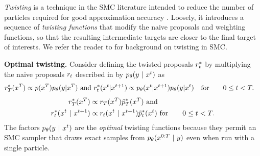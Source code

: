 
\emph{Twisting} is a technique in the SMC literature intended to reduce the number of particles required for good approximation accuracy \citep{guarniero2017iterated,heng2020controlled}. %
Loosely, it introduces a sequence of \emph{twisting functions} that modify the naive proposals and weighting functions, so that the resulting intermediate targets are closer to the final target of interests. 
We refer the reader to \citet[Chapter 3.2]{naesseth2019elements} for background on twisting in SMC.

\textbf{Optimal twisting.}
Consider defining the twisted proposals $r_t^*$ by multiplying the naive proposals $r_t$ described in  by $p_{\theta} (y ~\vert~ x^{t})$ as
\ifnum{}
\begin{align}\label{eq:optimal-twisted-proposals}
\proposal_T^* (\xT) &\propto p(\xT) \pmodel(y {|} \xT) \ \mathrm{and} \ 
     \proposal_t^* (\xt {|} \xtpo) \propto \pmodel(\xt {|} \xtpo) \pmodel(y{|} \xt) \quad \mathrm{for}  \qquad 0\leq t < T.
\end{align}
\else
\begin{align}\label{eq:optimal-twisted-proposals}
\proposal_T^* (\xT) &\propto \proposal_T (\xT) \twistfcn_T^* (\xT) \ \mathrm{and} \ 
\\
     \proposal_t^* (\xt \mid \xtpo) &\propto \proposal_t (\xt \mid \xtpo) \twistfcn_t^* (\xt) \ \mathrm{for}  \qquad 0\leq t < T.
\end{align}
\fi
The factors $p_{\theta}(y ~\vert~ x^{t})$ are the \emph{optimal} twisting functions
because they permit an SMC sampler that draws exact samples from $p_{\theta}(x^{0:T} ~\vert~ y)$ even when run with a single particle.

